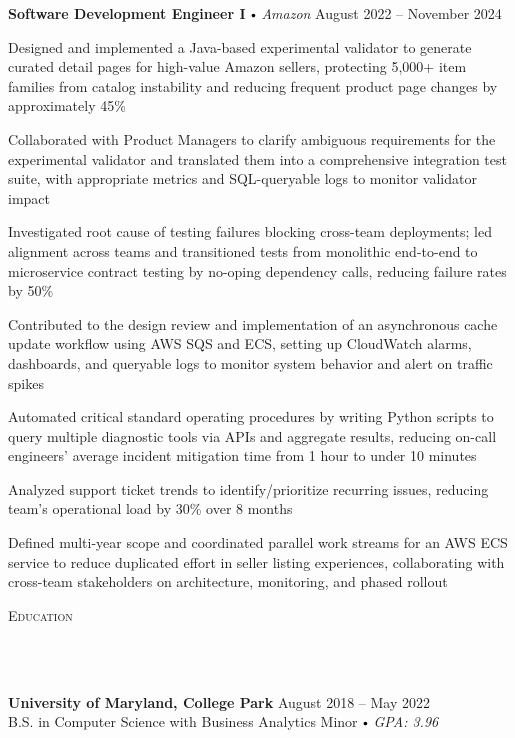 \documentclass{article}
\newcommand{\header}[1]{{
\hspace*{-15pt}\vspace*{10pt} \large \scshape{#1}} \vspace*{-6pt} 
\lineunder
}
\newcommand{\lineunder}{
\vspace*{-8pt} \\ \hspace*{-18pt} 
\hrulefill \\
}
\newcommand{\school}[4]{
\textbf{#1} #2 \hfill #3 \\ #4 \vspace*{5pt}
}
\newcommand{\employer}[4]{
\textbf{#1} \labelitemi \textit{#2} \hfill #3 \\ #4 \vspace*{3pt}
}
\renewcommand{\labelitemi}{
$\vcenter{\hbox{\tiny$\bullet$}}$\hspace*{3pt}
}
\renewcommand{\labelitemii}{
$\vcenter{\hbox{\tiny$\bullet$}}$\hspace*{-3pt}
}
\newenvironment{bullet-list-minor}{
\begin{list}{\labelitemii}{\setlength\leftmargin{15pt} 
\topsep 0pt \itemsep 1pt}}{\vspace*{4pt}\end{list}
}
\begin{document}
    \employer{Software Development Engineer I}{Amazon}{August 2022 -- November 2024}{}
    \smallskip
	\begin{bullet-list-minor}
        \item Designed and implemented a Java-based experimental validator to generate curated detail pages for high-value Amazon sellers, protecting 5,000+ item families from catalog instability and reducing frequent product page changes by approximately 45\%
        \item Collaborated with Product Managers to clarify ambiguous requirements for the experimental validator and translated them into a comprehensive integration test suite, with appropriate metrics and SQL-queryable logs to monitor validator impact
        \item Investigated root cause of testing failures blocking cross-team deployments; led alignment across teams and transitioned tests from monolithic end-to-end to microservice contract testing by no-oping dependency calls, reducing failure rates by 50\%
        \item Contributed to the design review and implementation of an asynchronous cache update workflow using AWS SQS and ECS, setting up CloudWatch alarms, dashboards, and queryable logs to monitor system behavior and alert on traffic spikes
        \item Automated critical standard operating procedures by writing Python scripts to query multiple diagnostic tools via APIs and aggregate results, reducing on-call engineers’ average incident mitigation time from 1 hour to under 10 minutes
        \item Analyzed support ticket trends to identify/prioritize recurring issues, reducing team’s operational load by 30\% over 8 months
        \item Defined multi-year scope and coordinated parallel work streams for an AWS ECS service to reduce duplicated effort in seller listing experiences, collaborating with cross-team stakeholders on architecture, monitoring, and phased rollout
    \end{bullet-list-minor}
    \smallskip
    \bigskip
   
\header{Education}
    \vspace{8pt}
    \school{University of Maryland, College Park}{}{August 2018 -- May 2022}{\vspace{4pt}  B.S. in Computer Science with Business Analytics Minor \labelitemi \textit{GPA: 3.96}}


\bigskip
\smallskip
\end{document}
